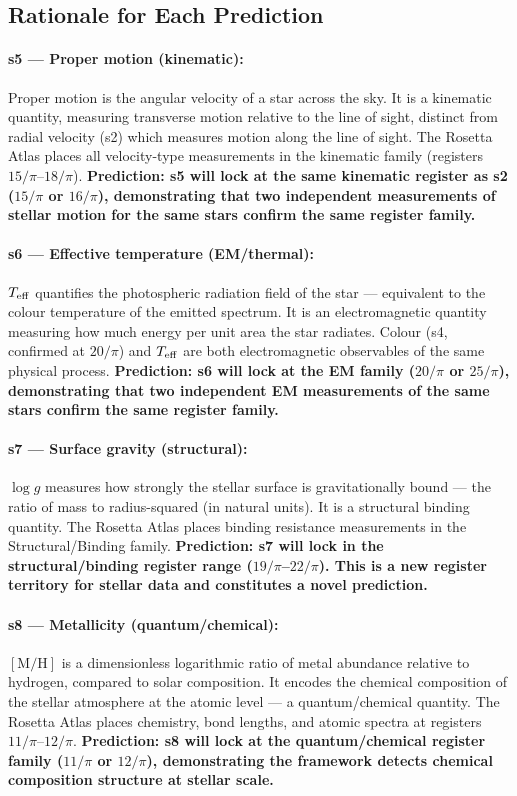 \documentclass[12pt,a4paper]{article}
\begin{document}
\subsection{Rationale for Each Prediction}

\paragraph{s5 --- Proper motion (kinematic):}
Proper motion is the angular velocity of a star across the sky. It is a
kinematic quantity, measuring transverse motion relative to the line of sight,
distinct from radial velocity (s2) which measures motion along the line of
sight. The Rosetta Atlas places all velocity-type measurements in the kinematic
family (registers $15/\pi$--$18/\pi$). \textbf{Prediction: s5 will lock at the
same kinematic register as s2 ($15/\pi$ or $16/\pi$), demonstrating that two
independent measurements of stellar motion for the same stars confirm the same
register family.}

\paragraph{s6 --- Effective temperature (EM/thermal):}
$T_{\rm eff}$ quantifies the photospheric radiation field of the star ---
equivalent to the colour temperature of the emitted spectrum. It is an
electromagnetic quantity measuring how much energy per unit area the star
radiates. Colour (s4, confirmed at $20/\pi$) and $T_{\rm eff}$ are both
electromagnetic observables of the same physical process. \textbf{Prediction:
s6 will lock at the EM family ($20/\pi$ or $25/\pi$), demonstrating that two
independent EM measurements of the same stars confirm the same register family.}

\paragraph{s7 --- Surface gravity (structural):}
$\log g$ measures how strongly the stellar surface is gravitationally bound
--- the ratio of mass to radius-squared (in natural units). It is a structural
binding quantity. The Rosetta Atlas places binding resistance measurements in
the Structural/Binding family. \textbf{Prediction: s7 will lock in the
structural/binding register range ($19/\pi$--$22/\pi$). This is a new
register territory for stellar data and constitutes a novel prediction.}

\paragraph{s8 --- Metallicity (quantum/chemical):}
$[\mathrm{M/H}]$ is a dimensionless logarithmic ratio of metal abundance relative
to hydrogen, compared to solar composition. It encodes the chemical composition
of the stellar atmosphere at the atomic level --- a quantum/chemical quantity.
The Rosetta Atlas places chemistry, bond lengths, and atomic spectra at registers
$11/\pi$--$12/\pi$. \textbf{Prediction: s8 will lock at the quantum/chemical
register family ($11/\pi$ or $12/\pi$), demonstrating the framework detects
chemical composition structure at stellar scale.}
\end{document}
